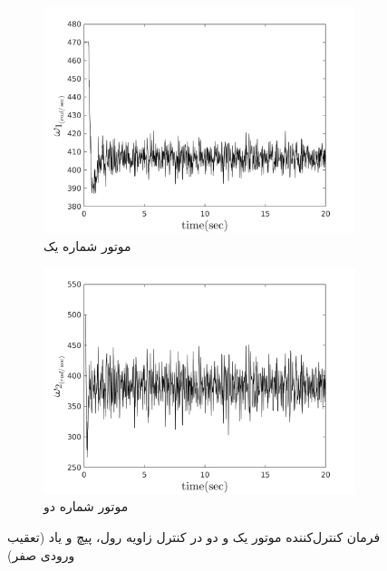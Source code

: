 \begin{figure}[H]
	\centering
	\begin{subfigure}[H]
		\centering
		\includegraphics[width=12cm]{../Figures/MIL/LQIDG/Roll_Pitch/lqidg_roll_pitch_Omega_1.png}
		\caption{موتور شماره یک}
	\end{subfigure}
	\begin{subfigure}[H]
		\centering
		\includegraphics[width=12cm]{../Figures/MIL/LQIDG/Roll_Pitch/lqidg_roll_pitch_Omega_2.png}
		\caption{موتور شماره دو}
	\end{subfigure}
	\caption{‫‪فرمان کنترل‌کننده موتور یک و دو در کنترل زاویه  رول، پیچ و یاد (تعقیب ورودی صفر)}
\end{figure}


